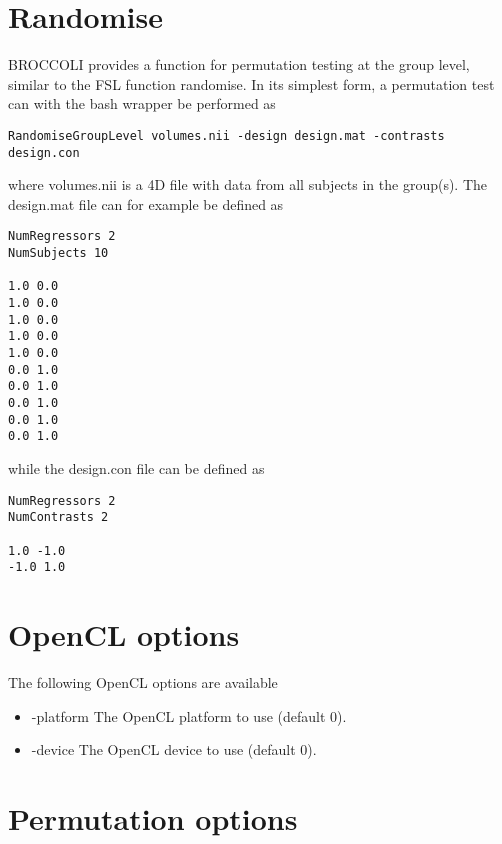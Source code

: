 \section{Randomise}

BROCCOLI provides a function for permutation testing at the group level, similar to the FSL function randomise. In its simplest form, a permutation test can with the bash wrapper be performed as

\begin{verbatim}
RandomiseGroupLevel volumes.nii -design design.mat -contrasts design.con 
\end{verbatim}
where volumes.nii is a 4D file with data from all subjects in the group(s). The design.mat file can for example be defined as

\begin{verbatim}
NumRegressors 2
NumSubjects 10

1.0 0.0
1.0 0.0
1.0 0.0
1.0 0.0
1.0 0.0
0.0 1.0
0.0 1.0
0.0 1.0
0.0 1.0
0.0 1.0
\end{verbatim}

while the design.con file can be defined as

\begin{verbatim}
NumRegressors 2
NumContrasts 2

1.0 -1.0
-1.0 1.0
\end{verbatim}


\section{OpenCL options}

The following OpenCL options are available

\begin{itemize}

\item -platform
\newline \newline The OpenCL platform to use (default 0).

\item -device
\newline \newline The OpenCL device to use (default 0).

\end{itemize}

\section{Permutation options}

